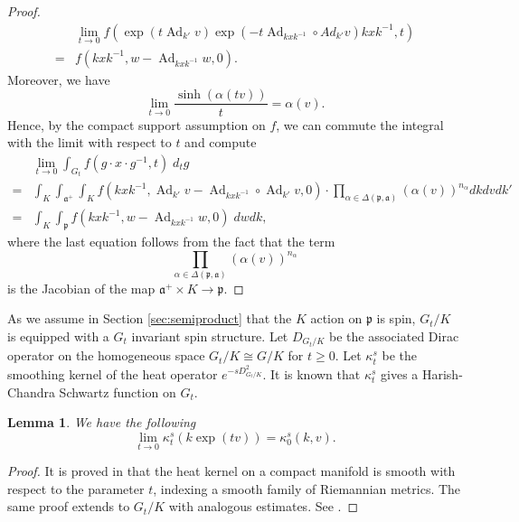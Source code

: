 \documentclass{amsproc}
\newtheorem{lemma}[theorem]{Lemma}
\theoremstyle{definition}
\theoremstyle{remark}
\numberwithin{equation}{section}
\DeclareMathOperator{\Ad}{Ad}
\newcommand{\ka}{\mathfrak{a}}
\newcommand{\kp}{\mathfrak{p}}
\begin{document}
\begin{proof}
\[
\begin{aligned}
&\lim_{t \to 0} f\left(\exp(t \Ad_{k'}v)\exp(-t\Ad_{kx k^{-1}}\circ Ad_{k'}v)kx k^{-1} , t\right ) \\
=&f\left(kx k^{-1}, w-\Ad_{kx k^{-1}}w , 0\right ) .
\end{aligned}
\]
Moreover, we have 
\[
\lim_{t \to 0} \frac{\sinh(\alpha(tv))}{t} = \alpha(v). 
\]
Hence, by the compact support assumption on $f$, we can commute the integral with the limit with respect to $t$ and compute
\[
\begin{aligned}
&\lim_{t \to 0}\int_{G_t} f(g \cdot x \cdot  g^{-1}, t) \; d_t g \\
=&	 \int_K \int_{\ka^+} \int_K f\left(kx k^{-1}, \Ad_{k'}v-\Ad_{kx k^{-1}} \circ \Ad_{k'}v , 0\right ) \cdot 
\prod_{\alpha \in \Delta(\kp, \ka)} \left(\alpha(v)\right)^{n_\alpha} dk dv dk'\\
=& \int_K  \int_\kp f\left(kx k^{-1}, w-\Ad_{kx k^{-1}} w , 0\right ) \; dw dk,
\end{aligned}
\]
where the last equation follows from the fact that the term 
\[
\prod_{\alpha \in \Delta(\kp, \ka)} \left(\alpha(v)\right)^{n_\alpha}
\]
is the Jacobian of the map $\ka^+ \times K \to \kp$.  
\end{proof}


As we assume in Section \ref{sec:semiproduct} that the $K$ action on $\mathfrak{p}$ is spin, $G_t/K$ is equipped with a $G_t$ invariant spin structure. Let $D_{G_t/K}$ be the associated Dirac operator on the homogeneous space $G_t/K \cong G/K$ for $t \geq 0$. Let $\kappa_t^s$ be the smoothing kernel of the heat operator $e^{-sD^2_{G_t/K}}$. It is known \cite{HC75} that $\kappa_t^s$ gives a Harish-Chandra Schwartz function on $G_t$.  

\begin{lemma}
We have the following
\[
\lim_{t \to 0} \kappa_t^s(k\exp(tv)) = \kappa_0^s(k, v). 
\]	
\end{lemma}
\begin{proof} 
It is proved in \cite[Theorem 2.48]{BGV} that the heat kernel on a compact manifold is smooth with respect to the parameter $t$, indexing a smooth family of Riemannian metrics. The same proof extends to $G_t/K$ with analogous estimates.  See \cite[Lemma 2.2, Theorem 2.2]{GR}.
\end{proof}
\end{document}
